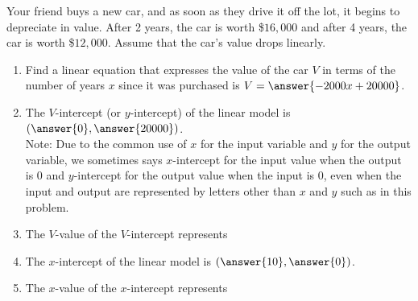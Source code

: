 \documentclass{ximera}
\author{Kenneth Berglund}
\begin{document}
\begin{exercise}

Your friend buys a new car, and as soon as they drive it off the lot, it begins to depreciate in value. After 2 years, the car is worth \$$16,000$ and after 4 years, the car is worth \$$12,000$. Assume that the car's value drops linearly. 

\begin{enumerate}
\item Find a linear equation that expresses the value of the car $V$ in terms of
the number of years $x$ since it was purchased is $V = \answer{-2000x + 20000}$. 

\item The $V$-intercept (or $y$-intercept) of the linear model is $(\answer{0},\answer{20000})$. \\
Note: Due to the common use of $x$ for the input variable and $y$ for the output variable, we sometimes says $x$-intercept for the input value when the output is 0 and $y$-intercept for the output value when the input is 0, even when the input and output are represented by letters other than $x$ and $y$ such as in this problem.

\item The $V$-value of the $V$-intercept represents
\begin{multipleChoice}
\end{multipleChoice}

\item The $x$-intercept of the linear model is $(\answer{10}, \answer{0})$.

\item The $x$-value of the $x$-intercept represents
\begin{multipleChoice}
\end{multipleChoice}

	
\end{enumerate}

\end{exercise}
\end{document}
